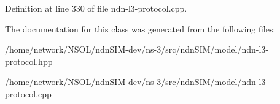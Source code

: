 Definition at line 330 of file ndn-\/l3-\/protocol.\+cpp.



The documentation for this class was generated from the following files\+:\begin{DoxyCompactItemize}
\item 
/home/network/\+N\+S\+O\+L/ndn\+S\+I\+M-\/dev/ns-\/3/src/ndn\+S\+I\+M/model/ndn-\/l3-\/protocol.\+hpp\item 
/home/network/\+N\+S\+O\+L/ndn\+S\+I\+M-\/dev/ns-\/3/src/ndn\+S\+I\+M/model/ndn-\/l3-\/protocol.\+cpp\end{DoxyCompactItemize}
